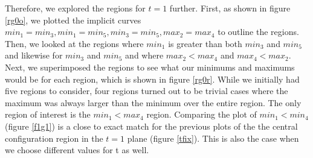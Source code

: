 \documentclass[11pt,leqno]{article}
\theoremstyle{definition}
\theoremstyle{remark}
\numberwithin{equation}{section}
\begin{document}
Therefore, we explored the regions for $t = 1$ further. First, as shown in figure \ref{rg0o}, we plotted the implicit curves $min_1=min_3, min_1=min_5,min_3=min_5,max_2=max_4$  to outline the regions. Then, we looked at the regions where $min_1$ is greater than both $min_3$ and $min_5$ and likewise for $min_3$ and $min_5$ and where $max_2<max_4$ and $max_4<max_2$. Next, we superimposed the regions to see what our minimums and maximums would be for each region, which is shown in figure \ref{rg0r}. While we initially had five regions to consider, four regions turned out to be trivial cases where the maximum was always larger than the minimum over the entire region. The only region of interest is the $min_1 < max_4$ region. Comparing the plot of $min_1 < min_4$ (figure \ref{f1g1}) is a close to exact match for the previous plots of the the central configuration region in the $t=1$ plane (figure \ref{tfix}). This is also the case when we choose different values for t as well.
\end{document}
